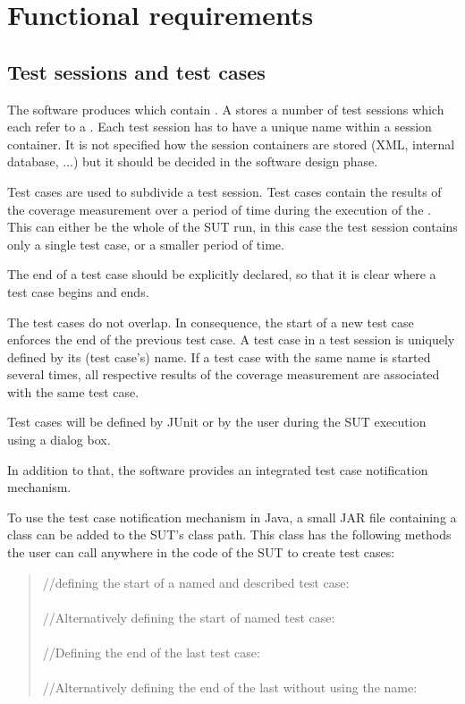 \section{Functional requirements} \label{fr:Functional requirements}
\subsection{Test sessions and test cases} \label{fr:Test sessions and test cases}
The software produces  which contain . A  stores a number of test sessions which each refer to a . Each test session has to have a unique name within a session container. It is not specified how the session containers are stored (XML, internal database, ...) but it should be decided in the software design phase.
\par
Test cases are used to subdivide a test session. Test cases contain the results of the coverage measurement over a period of time during the execution of the . This can either be the whole of the SUT run, in this case the test session contains only a single test case, or a smaller period of time.
\par
The end of a test case should be explicitly declared, so that it is clear where a test case begins and ends.
\par
The test cases do not overlap. In consequence, the start of a new test case enforces the end of the previous test case. A test case in a test session is uniquely defined by its (test case's) name. If a test case with the same name is started several times, all respective results of the coverage measurement are associated with the same test case.
\par
Test cases will be defined by JUnit or by the user during the SUT execution using a dialog box.
\par
In addition to that, the software provides an integrated test case notification mechanism.
\par
To use the test case notification mechanism in Java, a small JAR file containing a  class can be added to the SUT's class path. This class has the following methods the user can call anywhere in the code of the SUT to create test cases:
\begin{quote}
//defining the start of a named and described test case:\\
\\
//Alternatively defining the start of named test case:\\
\\
//Defining the end of the last test case:\\
\\
//Alternatively defining the end of the last without using the name:\\
\end{quote}
